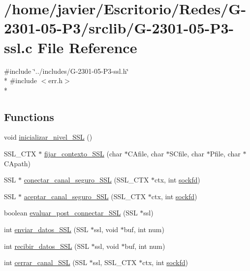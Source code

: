 \hypertarget{_g-2301-05-_p3-ssl_8c}{\section{/home/javier/\-Escritorio/\-Redes/\-G-\/2301-\/05-\/\-P3/srclib/\-G-\/2301-\/05-\/\-P3-\/ssl.c File Reference}
\label{_g-2301-05-_p3-ssl_8c}
}
{\ttfamily \#include \char`\"{}../includes/\-G-\/2301-\/05-\/\-P3-\/ssl.\-h\char`\"{}}\\*
{\ttfamily \#include $<$err.\-h$>$}\\*
\subsection*{Functions}
\begin{DoxyCompactItemize}
\item 
void \hyperlink{_g-2301-05-_p3-ssl_8c_a937108af8fd0832377b084e24172ee41}{inicializar\-\_\-nivel\-\_\-\-S\-S\-L} ()
\item 
S\-S\-L\-\_\-\-C\-T\-X $\ast$ \hyperlink{_g-2301-05-_p3-ssl_8c_a84a295d51a23d2558cbf65f436011dc6}{fijar\-\_\-contexto\-\_\-\-S\-S\-L} (char $\ast$C\-Afile, char $\ast$S\-Cfile, char $\ast$Pfile, char $\ast$C\-Apath)
\item 
S\-S\-L $\ast$ \hyperlink{_g-2301-05-_p3-ssl_8c_a79add582c01289f85c0a81569ee3b73e}{conectar\-\_\-canal\-\_\-seguro\-\_\-\-S\-S\-L} (S\-S\-L\-\_\-\-C\-T\-X $\ast$ctx, int \hyperlink{_g-2301-05-_p2-user_tools_8h_ad2c8fb3df3a737e0685e902870a611d2}{sockfd})
\item 
S\-S\-L $\ast$ \hyperlink{_g-2301-05-_p3-ssl_8c_aaeb9457077403f2261ca1a86e3802a1d}{aceptar\-\_\-canal\-\_\-seguro\-\_\-\-S\-S\-L} (S\-S\-L\-\_\-\-C\-T\-X $\ast$ctx, int \hyperlink{_g-2301-05-_p2-user_tools_8h_ad2c8fb3df3a737e0685e902870a611d2}{sockfd})
\item 
boolean \hyperlink{_g-2301-05-_p3-ssl_8c_a8abf144662cb4cfd12428524f425854c}{evaluar\-\_\-post\-\_\-connectar\-\_\-\-S\-S\-L} (S\-S\-L $\ast$ssl)
\item 
int \hyperlink{_g-2301-05-_p3-ssl_8c_a71ed04f7f38be4fd5b1abec30a9ee130}{enviar\-\_\-datos\-\_\-\-S\-S\-L} (S\-S\-L $\ast$ssl, void $\ast$buf, int num)
\item 
int \hyperlink{_g-2301-05-_p3-ssl_8c_a1efb5af79fa6ea71c4d9ceb8f718290f}{recibir\-\_\-datos\-\_\-\-S\-S\-L} (S\-S\-L $\ast$ssl, void $\ast$buf, int num)
\item 
int \hyperlink{_g-2301-05-_p3-ssl_8c_acdbfef38bb502e732928620f71daacd2}{cerrar\-\_\-canal\-\_\-\-S\-S\-L} (S\-S\-L $\ast$ssl, S\-S\-L\-\_\-\-C\-T\-X $\ast$ctx, int \hyperlink{_g-2301-05-_p2-user_tools_8h_ad2c8fb3df3a737e0685e902870a611d2}{sockfd})
\end{DoxyCompactItemize}


